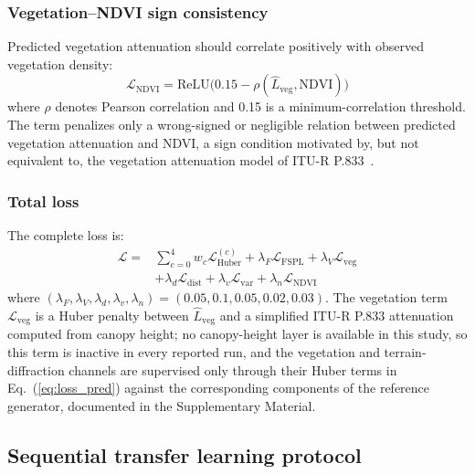 \documentclass{ieeeaccess}
\begin{document}
\subsubsection{Vegetation--NDVI sign consistency}

Predicted vegetation attenuation should correlate positively with observed vegetation density:
\begin{equation}
\mathcal{L}_{\text{NDVI}} = \mathrm{ReLU}\!\bigl(0.15 - \rho(\hat{L}_{\text{veg}}, \text{NDVI})\bigr)
\label{eq:loss_ndvi}
\end{equation}
where $\rho$ denotes Pearson correlation and 0.15 is a minimum-correlation threshold. The term penalizes only a wrong-signed or negligible relation between predicted vegetation attenuation and NDVI, a sign condition motivated by, but not equivalent to, the vegetation attenuation model of \mbox{ITU-R} P.833~\cite{itu833}.

\subsubsection{Total loss}

The complete loss is:
\begin{equation}
\label{eq:loss_total}
\begin{split}
\mathcal{L} ={}& \sum_{c=0}^{4} w_c \mathcal{L}_{\text{Huber}}^{(c)} + \lambda_F \mathcal{L}_{\text{FSPL}} + \lambda_V \mathcal{L}_{\text{veg}} \\
&+ \lambda_d \mathcal{L}_{\text{dist}} + \lambda_v \mathcal{L}_{\text{var}} + \lambda_n \mathcal{L}_{\text{NDVI}}
\end{split}
\end{equation}
where $(\lambda_F, \lambda_V, \lambda_d, \lambda_v, \lambda_n) = (0.05, 0.1, 0.05, 0.02, 0.03)$. The vegetation term $\mathcal{L}_{\text{veg}}$ is a Huber penalty between $\hat{L}_{\text{veg}}$ and a simplified \mbox{ITU-R} P.833 attenuation computed from canopy height; no canopy-height layer is available in this study, so this term is inactive in every reported run, and the vegetation and terrain-diffraction channels are supervised only through their Huber terms in Eq.~(\ref{eq:loss_pred}) against the corresponding components of the reference generator, documented in the Supplementary Material.

\subsection{Sequential transfer learning protocol}
\label{sec:transfer}
\end{document}
